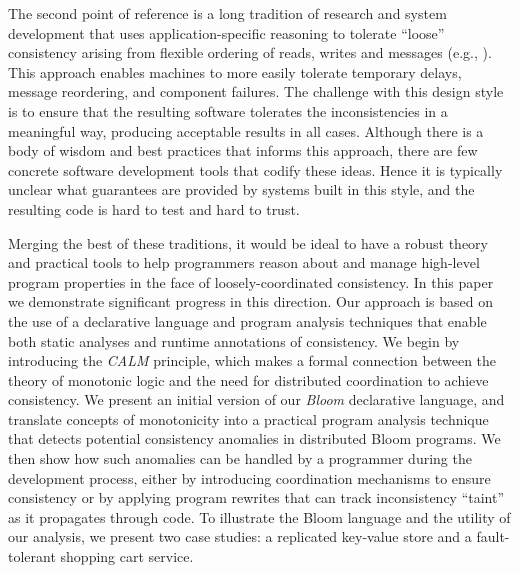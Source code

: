 The second point of reference is a long tradition of research and system development that uses application-specific reasoning to tolerate ``loose'' consistency arising from flexible ordering of reads, writes and messages (e.g., \cite{sagas,beyond,quicksand,base}). This approach enables machines to more easily tolerate temporary delays, message reordering, and component failures.  
The challenge with this design style is to ensure that the resulting software tolerates the inconsistencies in a meaningful way, producing acceptable results in all cases.  Although there is a body of wisdom and best practices that informs this approach, there are few concrete software development tools that codify these ideas.  Hence it is typically unclear what guarantees are provided by systems built in this style, and the resulting code is hard to test and hard to trust.  

Merging the best of these traditions, it would be ideal to have a robust theory
and practical tools to help programmers reason about and manage high-level
program properties in the face of loosely-coordinated consistency.  In this
paper we demonstrate significant progress in this direction.  Our approach is
based on the use of a declarative language and program analysis techniques that
enable both static analyses and runtime annotations of consistency.  We begin by
introducing the \emph{CALM} principle, which makes a formal connection between
the theory of monotonic logic and the need for distributed coordination to
achieve consistency.  We present an initial version of our {\em Bloom}
declarative language, and translate concepts of monotonicity into a practical
program analysis technique that detects potential consistency anomalies in
distributed Bloom programs.  We then show how such anomalies can be handled by a
programmer during the development process, either by introducing coordination
mechanisms to ensure consistency or by applying program rewrites that can track
inconsistency ``taint'' as it propagates through code.  To illustrate the Bloom
language and the utility of our analysis, we present two case studies: a
replicated key-value store and a fault-tolerant shopping cart service.


